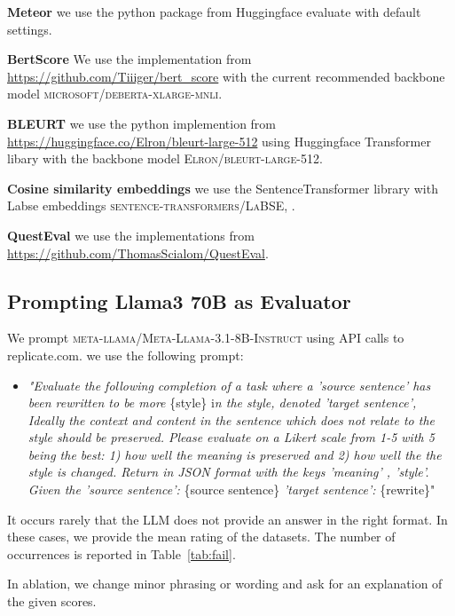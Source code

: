 \textbf{Meteor} \cite{banerjee-lavie-2005-meteor} we use the python package from Huggingface evaluate with default settings. 

\textbf{BertScore} \cite{zhang2019bertscore} We use the implementation from \url{https://github.com/Tiiiger/bert_score} with the current recommended backbone model \textsc{microsoft/deberta-xlarge-mnli}.

\textbf{BLEURT} \cite{sellam-etal-2020-bleurt} we use the python implemention from \url{https://huggingface.co/Elron/bleurt-large-512} using Huggingface Transformer libary with the backbone model \textsc{Elron/bleurt-large-512}.

\textbf{Cosine similarity embeddings} we use the SentenceTransformer library with Labse embeddings \textsc{sentence-transformers/LaBSE}, \cite{feng-etal-2022-language}.

\textbf{QuestEval} we use the implementations from \url{https://github.com/ThomasScialom/QuestEval}.

\subsection{Prompting Llama3 70B as Evaluator}
We prompt \textsc{meta-llama/Meta-Llama-3.1-8B-Instruct} using API calls to replicate.com. 
we use the following prompt:
\begin{itemize}
    \item \textit{"Evaluate the following completion of a task where a 'source sentence' has been rewritten to be more} \{style\} i\textit{n the style, denoted 'target sentence', Ideally the context and content in the sentence which does not relate to the style should be preserved. Please evaluate on a Likert scale from 1-5 with 5 being the best: 1) how well the meaning is preserved and 2) how well the the style is changed. Return in JSON format with the keys 'meaning' , 'style'. Given the 'source sentence':} \{source sentence\} \textit{'target sentence':} \{rewrite\}"
\end{itemize}
 It occurs rarely that the LLM does not provide an answer in the right format. In these cases, we provide the mean rating of the datasets. The number of occurrences is reported in Table~\ref{tab:fail}.  

 In ablation, we change minor phrasing or wording and ask for an explanation of the given scores.

